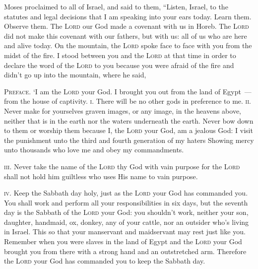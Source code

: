 
\begin{inparaenum}
     Moses proclaimed to all of Israel, and said to them, ``Listen, Israel, to the statutes and legal decisions that I am speaking into your ears today. Learn them. Observe them.%
     The \textsc{Lord} our God made a covenant with us in Horeb.%
     The \textsc{Lord} did not make this covenant with our fathers, but with us: all of us who are here and alive today.%
     On the mountain, the \textsc{Lord} spoke face to face with you from the midst of the fire.%
     I stood between you and the \textsc{Lord} at that time in order to declare the word of the \textsc{Lord} to you because you were afraid of the fire and didn't go up into the mountain, where he said,%
    
     \textsc{Preface.} `I am the \textsc{Lord} your God. I brought you out from the land of Egypt~--- from the house of captivity.%
     \textsc{i.} There will be no other gods in preference to me.%
     \textsc{ii.} Never make for yourselves graven images, or any image, in the heavens above, neither that is in the earth nor the waters underneath the earth.%
     Never bow down to them or worship them because I, the \textsc{Lord} your God, am a jealous God: I visit the punishment unto the third and fourth generation of my haters%
     Showing mercy unto thousands who love me and obey my commandments.%
    
     \textsc{iii.} Never take the name of the \textsc{Lord} thy God with vain purpose for the \textsc{Lord} shall not hold him guiltless who uses His name to vain purpose.%
    
     \textsc{iv.} Keep the Sabbath day holy, just as the \textsc{Lord} your God has commanded you.%
     You shall work and perform all your responsibilities in six days,%
     but the seventh day is the Sabbath of the \textsc{Lord} your God: you shouldn't work, neither your son, daughter, handmaid, ox, donkey, any of your cattle, nor an outsider who's living in Israel. This so that your manservant and maidservant may rest just like you.%
     Remember when you were slaves in the land of Egypt and the \textsc{Lord} your God brought you from there with a strong hand and an outstretched arm. Therefore the \textsc{Lord} your God has commanded you to keep the Sabbath day.%
    

\end{inparaenum}
